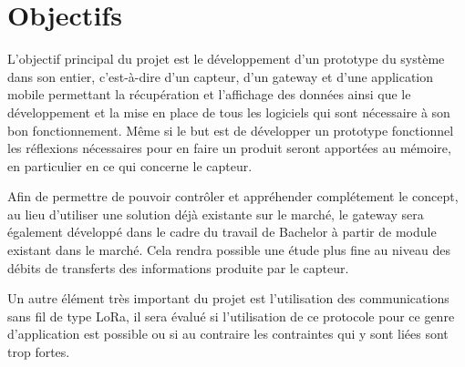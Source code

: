 \chapter{Objectifs}

L’objectif principal du projet est le développement d’un prototype du système dans son entier, c’est-à-dire d’un capteur, d’un gateway et d’une application mobile permettant la récupération et l’affichage des données ainsi que le développement et la mise en place de tous les logiciels qui sont nécessaire à son bon fonctionnement. Même si le but est de développer un prototype fonctionnel les réflexions nécessaires pour en faire un produit seront apportées au mémoire, en particulier en ce qui concerne le capteur.

Afin de permettre de pouvoir contrôler et appréhender complétement le concept, au lieu d’utiliser une solution déjà existante sur le marché, le gateway sera également développé dans le cadre du travail de Bachelor à partir de module existant dans le marché. Cela rendra possible une étude plus fine au niveau des débits de transferts des informations produite par le capteur.

Un autre élément très important du projet est l’utilisation des communications sans fil de type LoRa, il sera évalué si l’utilisation de ce protocole pour ce genre d’application est possible ou si au contraire les contraintes qui y sont liées sont trop fortes.
